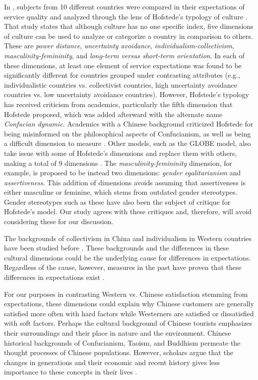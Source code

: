 \documentclass[smallextended,natbib]{svjour3}       %
\begin{document}
    In \cite{donthu1998cultural}, subjects from 10 different countries were compared in their expectations of service quality and analyzed through the lens of Hofstede's typology of culture \cite[][]{hofstede1984culture}. That study states that although culture has no one specific index, five dimensions of culture can be used to analyze or categorize a country in comparison to others. These are \textit{power distance}, \textit{uncertainty avoidance}, \textit{individualism-collectivism}, \textit{masculinity-femininity}, and \textit{long-term versus short-term orientation}. In each of these dimensions, at least one element of service expectations was found to be significantly different for countries grouped under contrasting attributes (e.g., individualistic countries vs. collectivist countries, high uncertainty avoidance countries vs. low uncertainty avoidance countries). However, Hofstede's typology has received criticism from academics, particularly the fifth dimension that Hofstede proposed, which was added afterward with the alternate name \textit{Confucian dynamic}. Academics with a Chinese background criticized Hofstede for being misinformed on the philosophical aspects of Confucianism, as well as being a difficult dimension to measure \cite[][]{fang2003critique}. Other models, such as the GLOBE model, also take issue with some of Hofstede's dimensions and replace them with others, making a total of 9 dimensions \cite[][]{house1999cultural}. The \textit{masculinity-femininity} dimension, for example, is proposed to be instead two dimensions: \textit{gender egalitarianism} and \textit{assertiveness}. This addition of dimensions avoids assuming that assertiveness is either masculine or feminine, which stems from outdated gender stereotypes. Gender stereotypes such as these have also been the subject of critique for Hofstede's model\cite[][]{jeknic2014gender}. Our study agrees with these critiques and, therefore, will avoid considering these for our discussion.
    
    The backgrounds of collectivism in China and individualism in Western countries have been studied before \cite[][]{gao2017chinese}. These backgrounds and the differences in these cultural dimensions could be the underlying cause for differences in expectations. Regardless of the cause, however, measures in the past have proven that these differences in expectations exist \cite[][]{armstrong1997importance}. 

    For our purposes in contrasting Western vs. Chinese satisfaction stemming from expectations, these dimensions could explain why Chinese customers are generally satisfied more often with hard factors while Westerners are satisfied or dissatisfied with soft factors. Perhaps the cultural background of Chinese tourists emphasizes their surroundings and their place in nature and the environment. Chinese historical backgrounds of Confucianism, Taoism, and Buddhism permeate the thought processes of Chinese populations. However, scholars argue that the changes in generations and their economic and recent history gives less importance to these concepts in their lives \cite[][]{gao2017chinese}. 
\end{document}
